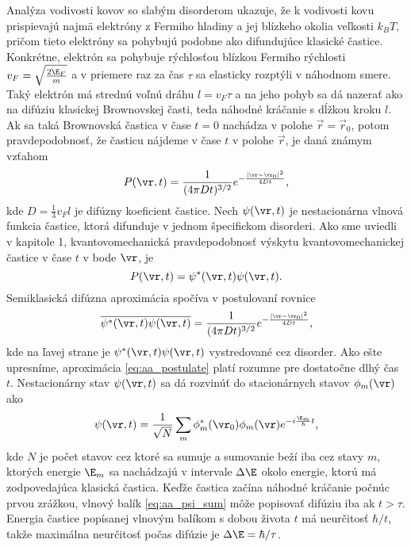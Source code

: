 Analýza vodivosti kovov so slabým disorderom ukazuje, že k vodivosti kovu prispievajú najmä elektróny z Fermiho hladiny a jej blízkeho okolia veľkosti $k_BT$, pričom tieto elektróny sa pohybujú podobne ako difundujúce klasické častice. Konkrétne, elektrón sa pohybuje rýchlosťou blízkou Fermiho rýchlosti $v_F=\sqrt{\frac{2\E_F}{m}}$ a v priemere raz za čas $\tau$ sa elasticky rozptýli v náhodnom smere. Taký elektrón má strednú voľnú dráhu
$l=v_F\tau$ a na jeho pohyb sa dá nazerať ako na difúziu klasickej Brownovskej časti, teda náhodné kráčanie s dĺžkou kroku $l$. 
Ak sa taká Brownovská častica v čase $t=0$ nachádza v polohe $\vec r = \vec r_0$, potom pravdepodobnosť, že časticu nájdeme v čase $t$ v polohe $\vec r$, je daná známym vzťahom
\begin{equation}
 \label{eq:diffusion}
 P(\vr,t)=\frac{1}{(4\pi Dt)^{3/2}}e^{-\frac{|\vr-\vr_0|^2}{4Dt}} \text{,}
\end{equation}
kde $D =\frac{1}{3}v_Fl $ je difúzny koeficient častice.
Nech $\psi(\vr,t)$ je nestacionárna vlnová funkcia častice, ktorá difunduje v jednom špecifickom disorderi. Ako sme uviedli v kapitole 1, kvantovomechanická pravdepodobnosť výskytu kvantovomechanickej častice v čase 
$t$ v bode $\vr$, je
\begin{equation}
 \label{eq:aa_pravd}
 P(\vr,t)=\psi^*(\vr,t)\psi(\vr,t) \text{.}
\end{equation}
Semiklasická difúzna aproximácia spočíva v postulovaní rovnice 
\begin{equation}
 \label{eq:aa_postulate}
 \overline{\psi^*(\vr,t)\psi(\vr,t)}=\frac{1}{(4\pi Dt)^{3/2}}e^{-\frac{|\vr-\vr_0|^2}{4Dt}} \text{,}
\end{equation}
kde na ľavej strane je $\psi^*(\vr,t)\psi(\vr,t)$ vystredované cez disorder. Ako ešte upresníme, aproximácia \eqref{eq:aa_postulate} platí rozumne pre dostatočne dlhý čas $t$.
Nestacionárny stav $\psi(\vr,t)$ sa dá rozvinúť do stacionárnych stavov $\phi_m(\vr)$ ako
\begin{equation}
 \label{eq:aa_psi_sum}
 \psi(\vr,t)=\frac{1}{\sqrt{N}}\sum_m \phi_m^*(\vr_0)\phi_m(\vr)e^{-i\frac{\E_m}{\hbar}t} \text{,}
\end{equation}
kde $N$ je počet stavov cez ktoré sa sumuje a sumovanie beží iba cez stavy $m$, ktorých energie $\E_m$ sa nachádzajú v intervale $\Delta \E$ okolo energie, ktorú má zodpovedajúca klasická častica.
Keďže častica začína náhodné kráčanie počnúc prvou zrážkou, vlnový balík \eqref{eq:aa_psi_sum} môže popisovať difúziu iba ak $t > \tau$. Energia častice popísanej 
vlnovým balíkom s dobou života $t$ má neurčitosť $\hbar/t$, takže maximálna neurčitosť počas difúzie je $\Delta \E=\hbar/\tau$.


